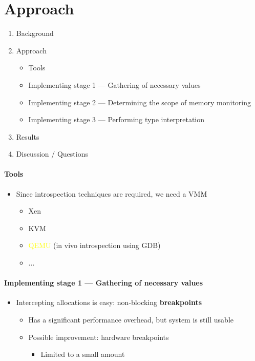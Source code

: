 \documentclass{i20lecture}
\begin{document}
\section{Approach}
\begin{frame}{\insertsection}
  \begin{enumerate}
   \item Background
    \item Approach
    \begin{itemize}
        \item Tools
        \item Implementing stage 1 --- Gathering of necessary values
        \item Implementing stage 2 --- Determining the scope of memory monitoring
        \item Implementing stage 3 --- Performing type interpretation
    \end{itemize}
    \item Results
    \item Discussion / Questions
  \end{enumerate}
\end{frame}

\begin{frame}{\insertsection}
  \framesubtitle{Tools}

  \begin{itemize}
   \item Since introspection techniques are required, we need a VMM
\pause
    \begin{itemize}
    \item Xen
    \item KVM
	\item \textcolor{yellow}{QEMU} (in vivo introspection using GDB)
    \item ...
    \end{itemize}
  \end{itemize}
\end{frame}

\begin{frame}{\insertsection}
  \framesubtitle{Implementing stage 1 --- Gathering of necessary values}

    \begin{itemize}
	\item Intercepting allocations is easy: non-blocking \textbf{breakpoints}
     \begin{itemize}
\pause
      \item Has a significant performance overhead, but system is still usable
\pause
      \item Possible improvement: hardware breakpoints
\pause
        \begin{itemize}
			\item Limited to a small amount
        \end{itemize}
     \end{itemize}
    \end{itemize}
\end{frame}
\end{document}
